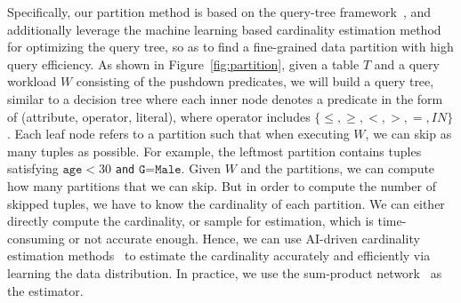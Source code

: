  Specifically, our partition method is based on the query-tree framework~\cite{qdtree}, and additionally leverage the machine learning based cardinality estimation method for optimizing the query tree, so as to find a fine-grained data partition with high query efficiency. 
As shown in Figure~\ref{fig:partition}, given a table $T$ and a query workload $W$ consisting of the pushdown predicates, we will build a query tree, similar to a decision tree where each inner node denotes a predicate in the form of (attribute, operator, literal), where operator includes $\{\leq, \geq, <, >, =, IN\}$. Each leaf node refers to a partition such that when executing $W$, we can skip as many tuples as possible. For example, the leftmost partition contains tuples satisfying $\texttt{age}<30$ \texttt{and} $\texttt{G=Male}$. Given $W$ and the partitions, we can compute how many partitions that we can skip. But in order to compute the number of skipped tuples, we have to know the cardinality of each partition. We can either directly compute the cardinality, or sample for estimation, which is time-consuming or not accurate enough. Hence, we can use AI-driven cardinality estimation methods~\cite{naru, deepdb} to estimate the cardinality accurately and efficiently via learning the data distribution. In practice, we use the sum-product network~\cite{deepdb} as the estimator. 




